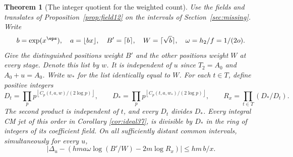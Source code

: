 \documentclass[a4paper,11pt]{article}
\newtheorem{theorem}[proposition]{Theorem}
\theoremstyle{definition}
\theoremstyle{remark}
\numberwithin{equation}{section}
\begin{document}
\begin{theorem}[The integer quotient for the weighted count]\leavevmode\label{thm:divide38}
Use the fields and translates of Proposition~\ref{prop:field12} on the intervals of Section~\ref{sec:missing}. Write
\[
 b=\exp(x^\eps),\quad a=\lfloor bx\rfloor,\quad
 B'=\lceil b\rceil,\quad W=\lceil\sqrt b\rceil,\quad
 \omega=h_2/f=1/(2o).
\]
Give the distinguished positions weight \(B'\) and the other positions weight \(W\) at every stage. Denote this list by \(w\). It is independent of \(u\) since \(T_2=A_0\) and \(A_0+u=A_0\). Write \(w_*\) for the list identically equal to \(W\). For each \(t\in T\), define positive integers
\[
 D_t=\prod_p p^{\left\lfloor C_p(t,a,w)/(2\log p)\right\rfloor},
 \qquad D_*=\prod_p p^{\left\lfloor C_p(t,a,w_*)/(2\log p)\right\rfloor},
 \qquad R_x=\prod_{t\in T}(D_*/D_t).
\]
The second product is independent of \(t\), and every \(D_t\) divides \(D_*\). Every integral CM jet of this order in Corollary \ref{cor:ideal37}, is divisible by \(D_*\) in the ring of integers of its coefficient field. On all sufficiently distant common intervals, simultaneously for every \(u\),
\begin{equation}
  \left|\Delta_u-
       \left(hm a\omega\log(B'/W)-2m\log R_x\right)\right|
                        \le hm\,b/x .                          \label{eq:divide38}
\end{equation}
\end{theorem}
\end{document}
